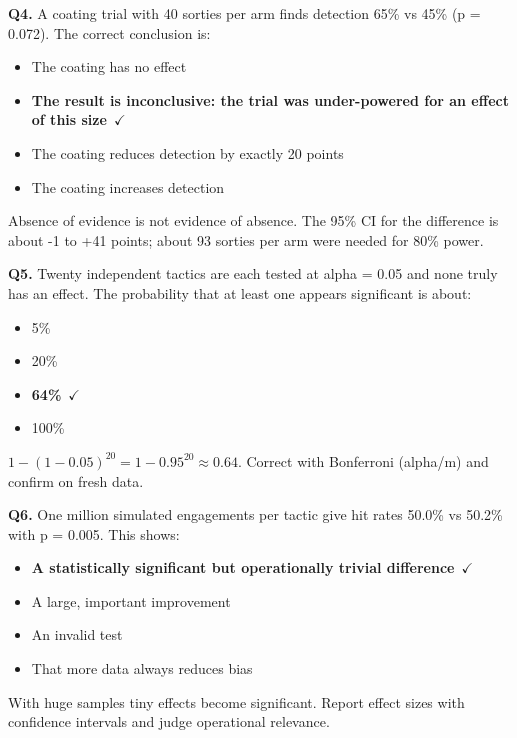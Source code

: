 \documentclass[11pt]{article}
\begin{document}
{\noindent\textbf{Q4.} A coating trial with 40 sorties per arm finds detection 65\% vs 45\% (p = 0.072). The correct conclusion is:\begin{itemize}[leftmargin=2.2em,itemsep=0pt,topsep=1pt]\item[A.] The coating has no effect\item[\textbf{B.}] \textbf{The result is inconclusive: the trial was under-powered for an effect of this size}~{\color{GrnN}$\checkmark$}\item[C.] The coating reduces detection by exactly 20 points\item[D.] The coating increases detection\end{itemize} Absence of evidence is not evidence of absence. The 95\% CI for the difference is about -1 to +41 points; about 93 sorties per arm were needed for 80\% power.\par\medskip

\noindent\textbf{Q5.} Twenty independent tactics are each tested at alpha = 0.05 and none truly has an effect. The probability that at least one appears significant is about:\begin{itemize}[leftmargin=2.2em,itemsep=0pt,topsep=1pt]\item[A.] 5\%\item[B.] 20\%\item[\textbf{C.}] \textbf{64\%}~{\color{GrnN}$\checkmark$}\item[D.] 100\%\end{itemize} $1-(1-0.05)^{20}=1-0.95^{20}\approx0.64$. Correct with Bonferroni (alpha/m) and confirm on fresh data.\par\medskip

\noindent\textbf{Q6.} One million simulated engagements per tactic give hit rates 50.0\% vs 50.2\% with p = 0.005. This shows:\begin{itemize}[leftmargin=2.2em,itemsep=0pt,topsep=1pt]\item[\textbf{A.}] \textbf{A statistically significant but operationally trivial difference}~{\color{GrnN}$\checkmark$}\item[B.] A large, important improvement\item[C.] An invalid test\item[D.] That more data always reduces bias\end{itemize} With huge samples tiny effects become significant. Report effect sizes with confidence intervals and judge operational relevance.\par\medskip

}
\end{document}

